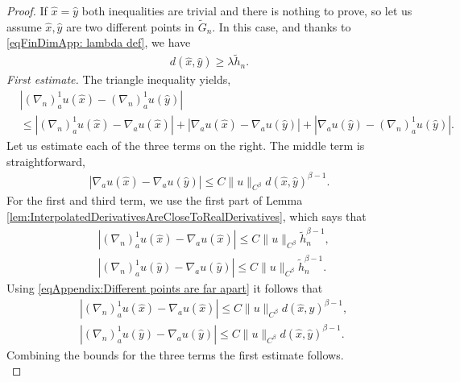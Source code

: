 \documentclass[11pt,reqno]{amsart}
\numberwithin{equation}{section}
\theoremstyle{plain}
\begin{document}
\begin{proof}
  If $\hat x=\hat y$ both inequalities are trivial and there is nothing to prove, so let us assume $\hat x,\hat y$ are two different points in $\tilde G_n$. In this case, and thanks to \eqref{eqFinDimApp: lambda def}, we have
  \begin{align}	
    d(\hat x,\hat y) \geq \lambda \tilde h_n.\label{eqAppendix:Different points are far apart}	
  \end{align}
  \emph{First estimate.} The triangle inequality yields,
  \begin{align*}  	
    & |(\nabla_n)_a^1 u(\hat x)-(\nabla_n)_a^1 u(\hat y)| \\
    & \leq |(\nabla_n)_a^1 u(\hat x)-\nabla_a u(\hat x)|+ |\nabla_a u(\hat x)-\nabla_a u(\hat y)|+ |\nabla_a u(\hat y)-(\nabla_n)_a^1 u(\hat y)|.	
  \end{align*}
  Let us estimate each of the three terms on the right. The middle term is straightforward,
  \begin{align*}	
    |\nabla_a u(\hat x)-\nabla_a u(\hat y)|\leq C\|u\|_{C^\beta}d(\hat x,\hat y)^{\beta-1}.
  \end{align*}	
  For the first and third term, we use the first part of Lemma \ref{lem:InterpolatedDerivativesAreCloseToRealDerivatives}, which says that
  \begin{align*}	
    & |(\nabla_n)_a^1 u(\hat x)-\nabla_a u(\hat x)| \leq C\|u\|_{C^\beta}\tilde h_n^{\beta-1},\\
    & |(\nabla_n)_a^1 u(\hat y)-\nabla_a u(\hat y)| \leq C\|u\|_{C^\beta}\tilde h_n^{\beta-1}.
  \end{align*}	  
  Using \eqref{eqAppendix:Different points are far apart} it follows that
  \begin{align*}	
    & |(\nabla_n)_a^1 u(\hat x)-\nabla_a u(\hat x)| \leq C\|u\|_{C^\beta}d(\hat x,\hat y)^{\beta-1},\\
    & |(\nabla_n)_a^1 u(\hat y)-\nabla_a u(\hat y)| \leq C\|u\|_{C^\beta}d(\hat x,\hat y)^{\beta-1}.
  \end{align*}	
  Combining the bounds for the three terms the first estimate follows.\\
  

\end{proof}
\end{document}
